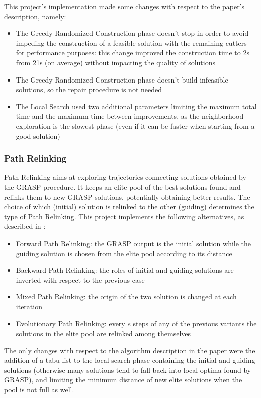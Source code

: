 This project's implementation made some changes with respect to the paper's description, namely:
\begin{itemize}[itemsep=-1mm, topsep=0mm]
	\item The Greedy Randomized Construction phase doesn't stop in order to avoid impeding the construction of a feasible solution with the remaining cutters for performance purposes: this change improved the construction time to 2s from 21s (on average) without impacting the quality of solutions
	\item The Greedy Randomized Construction phase doesn't build infeasible solutions, so the repair procedure is not needed
	\item The Local Search used two additional parameters limiting the maximum total time and the maximum time between improvements, as the neighborhood exploration is the slowest phase (even if it can be faster when starting from a good solution\cite{local_search})
\end{itemize}

\subsubsection{Path Relinking}
Path Relinking aims at exploring trajectories connecting solutions obtained by the GRASP procedure. It keeps an elite pool of the best solutions found and relinks them to new GRASP solutions, potentially obtaining better results. The choice of which (initial) solution is relinked to the other (guiding) determines the type of Path Relinking. This project implements the following alternatives, as described in \cite{grasp}:
\begin{itemize}[itemsep=-1mm, topsep=0mm]
	\item Forward Path Relinking: the GRASP output is the initial solution while the guiding solution is chosen from the elite pool according to its distance
	\item Backward Path Relinking: the roles of initial and guiding solutions are inverted with respect to the previous case
	\item Mixed Path Relinking: the origin of the two solution is changed at each iteration
	\item Evolutionary Path Relinking: every $e$ steps of any of the previous variants the solutions in the elite pool are relinked among themselves
\end{itemize}
The only changes with respect to the algorithm description in the paper were the addition of a tabu list to the local search phase containing the initial and guiding solutions (otherwise many solutions tend to fall back into local optima found by GRASP), and limiting the minimum distance of new elite solutions when the pool is not full as well.

